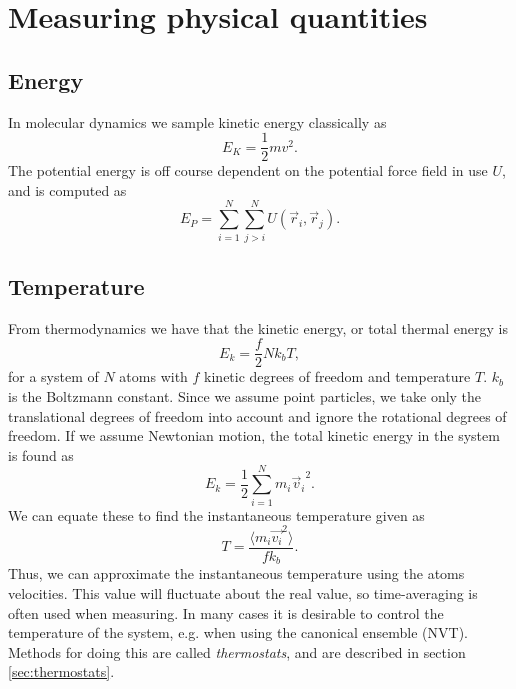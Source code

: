 \documentclass[twoside,english]{uiofysmaster}
\begin{document}
\section{Measuring physical quantities}
\subsection{Energy}
In molecular dynamics we sample kinetic energy classically as
\begin{equation}
	E_K = \frac{1}{2}mv^2.
\end{equation}
The potential energy is off course dependent on the potential force field in use $U$, and is computed as 
\begin{equation}
	E_P = \sum_{i=1}^{N}\sum_{j>i}^{N}U(\vec{r}_i, \vec{r}_j).
\end{equation} 

\subsection{Temperature}
From thermodynamics we have that the kinetic energy, or total thermal energy is 
\begin{equation}
E_k = \frac{f}{2} Nk_bT, 
\end{equation}
for a system of $N$ atoms with $f$ kinetic degrees of freedom and temperature $T$.  
$k_b$ is the Boltzmann constant. 
Since we assume point particles, we take only the translational degrees of freedom into account and ignore the rotational degrees of freedom.
If we assume Newtonian motion, the total kinetic energy in the system is found as
\begin{equation}
E_k = \frac{1}{2}\sum_{i=1}^{N} m_i {\vec{v}_i}^2.
\end{equation}
We can equate these to find the instantaneous temperature given as
\begin{equation}\label{eq:MDtemperature}
T = \frac{\langle m_i \vec{v_i}^2\rangle}{fk_b}.
\end{equation}
Thus, we can approximate the instantaneous temperature using the atoms velocities.
This value will fluctuate about the real value, so time-averaging is often used when measuring.
In many cases it is desirable to control the temperature of the system, e.g. when using the canonical ensemble (NVT).
Methods for doing this are called \textit{thermostats}, and are described in section \ref{sec:thermostats}.
\end{document}
